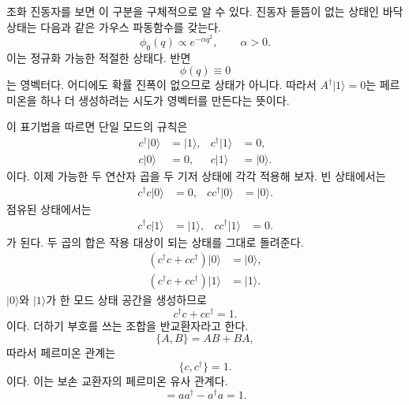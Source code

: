 \begin{classroomqa}
\end{classroomqa}

조화 진동자를 보면 이 구분을 구체적으로 알 수 있다. 진동자 들뜸이 없는 상태인 바닥 상태는 다음과 같은 가우스 파동함수를 갖는다.
\begin{equation}
\phi_0(q)\propto e^{-\alpha q^2},
\qquad \alpha>0.
\end{equation}
이는 정규화 가능한 적절한 상태다. 반면
\begin{equation}
\phi(q)\equiv0
\end{equation}
는 영벡터다. 어디에도 확률 진폭이 없으므로 상태가 아니다. 따라서 \(A^\dagger|1\rangle=0\)는 페르미온을 하나 더 생성하려는 시도가 영벡터를 만든다는 뜻이다.

\begin{classroomqa}
\end{classroomqa}

이 표기법을 따르면 단일 모드의 규칙은
\begin{align}
c^\dagger|0\rangle&=|1\rangle,
&c^\dagger|1\rangle&=0,
\\
c|0\rangle&=0,
&c|1\rangle&=|0\rangle.
\end{align}
이다. 이제 가능한 두 연산자 곱을 두 기저 상태에 각각 적용해 보자. 빈 상태에서는
\begin{align}
c^\dagger c|0\rangle&=0,
&
cc^\dagger|0\rangle&=|0\rangle.
\end{align}
점유된 상태에서는
\begin{align}
c^\dagger c|1\rangle&=|1\rangle,
&
cc^\dagger|1\rangle&=0.
\end{align}
가 된다. 두 곱의 합은 작용 대상이 되는 상태를 그대로 돌려준다.
\begin{align}
(c^\dagger c+cc^\dagger)|0\rangle&=|0\rangle,
\\
(c^\dagger c+cc^\dagger)|1\rangle&=|1\rangle.
\end{align}
\(|0\rangle\)와 \(|1\rangle\)가 한 모드 상태 공간을 생성하므로
\begin{equation}
c^\dagger c+cc^\dagger=1.
\end{equation}
이다. 더하기 부호를 쓰는 조합을 반교환자라고 한다.
\begin{equation}
\{A,B\}=AB+BA,
\end{equation}
따라서 페르미온 관계는
\begin{equation}
\{c,c^\dagger\}=1.
\end{equation}
이다. 이는 보손 교환자의 페르미온 유사 관계다.
\begin{equation}
[a,a^\dagger]=aa^\dagger-a^\dagger a=1.
\end{equation}

